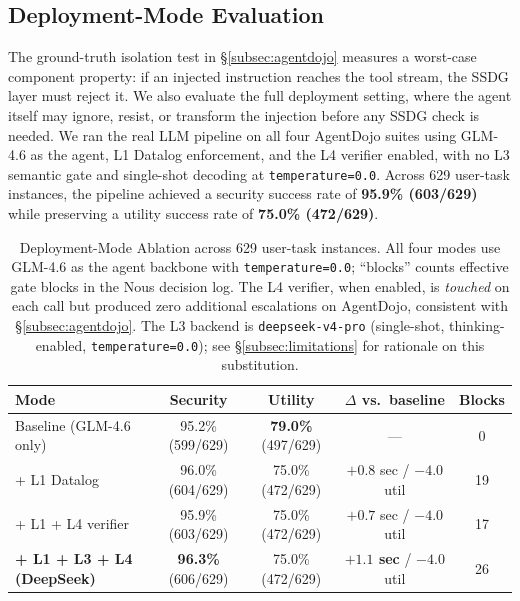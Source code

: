 \documentclass{article}
\theoremstyle{definition}
\begin{document}
\subsection{Deployment-Mode Evaluation}
\label{subsec:deployment_mode}

The ground-truth isolation test in \S\ref{subsec:agentdojo} measures a
worst-case component property: if an injected instruction reaches the
tool stream, the SSDG layer must reject it. We also evaluate the full
deployment setting, where the agent itself may ignore, resist, or
transform the injection before any SSDG check is needed. We ran the
real LLM pipeline on all four AgentDojo suites using GLM-4.6 as the
agent, L1 Datalog enforcement, and the L4 verifier enabled, with no L3
semantic gate and single-shot decoding at \texttt{temperature=0.0}.
Across 629 user-task instances, the pipeline achieved a security
success rate of \textbf{95.9\% (603/629)} while preserving a utility
success rate of \textbf{75.0\% (472/629)}.

\begin{table}[!h]
  \centering
  \caption{Deployment-Mode Ablation across 629 user-task instances. All
    four modes use GLM-4.6 as the agent backbone with
    \texttt{temperature=0.0}; ``blocks'' counts effective gate blocks
    in the Nous decision log. The L4 verifier, when enabled, is
    \emph{touched} on each call but produced zero additional escalations
    on AgentDojo, consistent with \S\ref{subsec:agentdojo}. The L3
    backend is \texttt{deepseek-v4-pro} (single-shot, thinking-enabled,
    \texttt{temperature=0.0}); see \S\ref{subsec:limitations} for
    rationale on this substitution.}
  \label{tab:deployment_ablation}
  \small
  \begin{tabular}{lcccc}
    \toprule
    \textbf{Mode} & \textbf{Security} & \textbf{Utility} & \textbf{$\Delta$ vs.\ baseline} & \textbf{Blocks} \\
    \midrule
    Baseline (GLM-4.6 only)         & 95.2\% (599/629) & \textbf{79.0\%} (497/629) & ---                          & 0  \\
    + L1 Datalog                    & 96.0\% (604/629) & 75.0\% (472/629)          & $+0.8$ sec / $-4.0$ util     & 19 \\
    + L1 + L4 verifier              & 95.9\% (603/629) & 75.0\% (472/629)          & $+0.7$ sec / $-4.0$ util     & 17 \\
    \textbf{+ L1 + L3 + L4 (DeepSeek)}& \textbf{96.3\%} (606/629) & 75.0\% (472/629) & \textbf{$+1.1$ sec} / $-4.0$ util & 26 \\
    \bottomrule
  \end{tabular}
\end{table}
\end{document}
